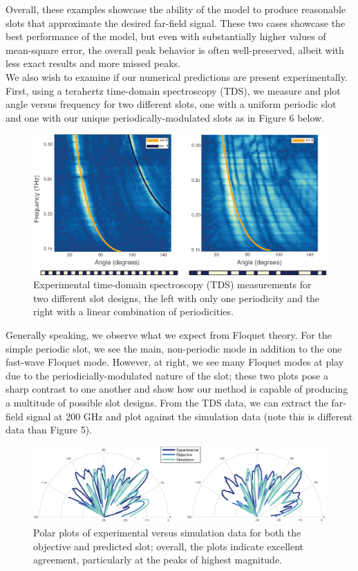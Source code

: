 \documentclass[11pt]{article}
\begin{document}
\noindent Overall, these examples showcase the ability of the model to produce reasonable slots that approximate the desired far-field signal. These two cases showcase the best performance of the model, but even with substantially higher values of mean-square error, the overall peak behavior is often well-preserved, albeit with less exact results and more missed peaks.  \\

\noindent We also wish to examine if our numerical predictions are present experimentally. First, using a terahertz time-domain spectroscopy (TDS), we measure and plot angle versus frequency for two different slots, one with a uniform periodic slot and one with our unique periodically-modulated slots as in Figure 6 below.

\begin{figure}[H]
	\centering
	\includegraphics{figures/exp-fig1.eps}
	\caption{Experimental time-domain spectroscopy (TDS) measurements for two different slot designs, the left with only one periodicity and the right with a linear combination of periodicities.}
\end{figure}

\noindent Generally speaking, we observe what we expect from Floquet theory. For the simple periodic slot, we see the main, non-periodic mode in addition to the one fast-wave Floquet mode. However, at right, we see many Floquet modes at play due to the periodicially-modulated nature of the slot; these two plots pose a sharp contrast to one another and show how our method is capable of producing a multitude of possible slot designs. From the TDS data, we can extract the far-field signal at 200 GHz and plot against the simulation data (note this is different data than Figure 5).

\begin{figure}[H]
	\centering
	\includegraphics[width=7in]{figures/fig8.eps}
	\caption{Polar plots of experimental versus simulation data for both the objective and predicted slot; overall, the plots indicate excellent agreement, particularly at the peaks of highest magnitude.}
\end{figure}
\end{document}
